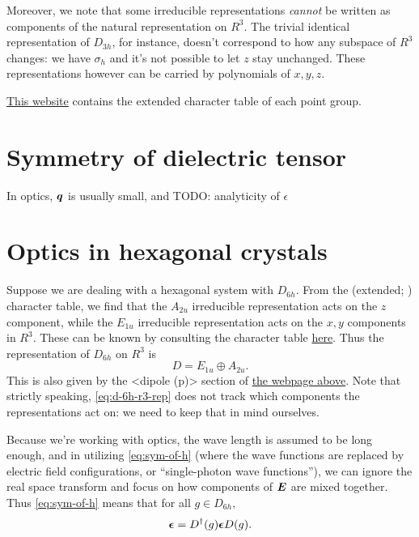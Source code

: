 \documentclass[hyperref, a4paper, 12pt]{article}
\def\texttt#1{<#1>}%
\def\mathbb#1{#1}%
\newcommand{\shortcode}[1]{\texttt{#1}}
\begin{document}
Moreover, we note that some irreducible representations \emph{cannot} be 
written as components of the natural representation on $\mathbb{R}^3$.
The trivial identical representation of $D_{3h}$,
for instance, doesn't correspond to how any subspace of $\mathbb{R}^3$ changes:
we have $\sigma_h$ and it's not possible to let $z$ stay unchanged.
These representations however can be carried by polynomials of $x, y, z$.

\href{http://symmetry.constructor.university/}{This website} 
contains the extended character table of each point group.

\section{Symmetry of dielectric tensor}

In optics, $\vb*{q}$ is usually small,
and TODO: analyticity of $\epsilon$

\section{Optics in hexagonal crystals}

Suppose we are dealing with a hexagonal system with $D_{6h}$.
From the (extended; ) character table,
we find that the $A_{2u}$ irreducible representation acts on the $z$ component,
while the $E_{1u}$ irreducible representation acts on the $x, y$ components in $\mathbb{R}^3$.
These can be known by consulting the character table \href{http://symmetry.constructor.university/cgi-bin/group.cgi?group=606&option=4}{here}.
Thus the representation of $D_{6h}$ on $\mathbb{R}^3$ is 
\begin{equation}
    D = E_{1u} \oplus A_{2u}.
    \label{eq:d-6h-r3-rep}
\end{equation}
This is also given by the \shortcode{dipole (p)} section of 
\href{http://symmetry.constructor.university/cgi-bin/group.cgi?group=606&option=4}{the webpage above}.
Note that strictly speaking, \eqref{eq:d-6h-r3-rep} does not track which components the representations act on:
we need to keep that in mind ourselves.

Because we're working with optics, the wave length is assumed to be long enough,
and in utilizing \eqref{eq:sym-of-h} (where the wave functions are replaced by
electric field configurations, or ``single-photon wave functions''),
we can ignore the real space transform and focus on how components of $\vb*{E}$
are mixed together.
Thus \eqref{eq:sym-of-h} means that for all $g \in D_{6h}$,
\begin{equation}
    \vb*{\epsilon} = D^\dag(g) \vb*{\epsilon} D(g).
\end{equation}
\end{document}

